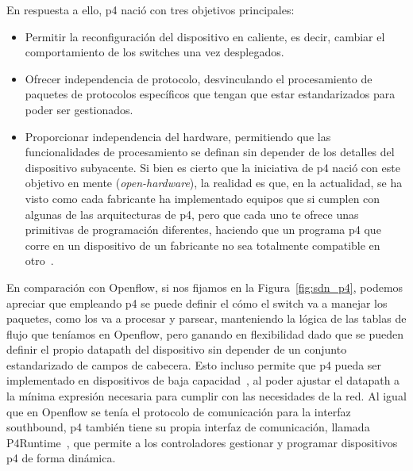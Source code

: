 En respuesta a ello, \gls{p4} nació con tres objetivos principales: 

\begin{itemize}
    \item Permitir la reconfiguración del dispositivo en caliente, es decir, cambiar el comportamiento de los switches una vez desplegados.
    
    \item Ofrecer independencia de protocolo, desvinculando el procesamiento de paquetes de protocolos específicos que tengan que estar estandarizados para poder ser gestionados.
    
    \item Proporcionar independencia del hardware, permitiendo que las funcionalidades de procesamiento se definan sin depender de los detalles del dispositivo subyacente. Si bien es cierto que la iniciativa de \gls{p4} nació con este objetivo en mente (\textit{open-hardware}), la realidad es que, en la actualidad, se ha visto como cada fabricante ha implementado equipos que si cumplen con algunas de las arquitecturas de \gls{p4}, pero que cada uno te ofrece unas primitivas de programación diferentes, haciendo que un programa \gls{p4} que corre en un dispositivo de un fabricante no sea totalmente compatible en otro~\cite{hauser2023survey}. 
\end{itemize}

En comparación con Openflow, si nos fijamos en la Figura~\ref{fig:sdn_p4}, podemos apreciar que empleando \gls{p4} se puede definir el cómo el switch va a manejar los paquetes, como los va a procesar y parsear, manteniendo la lógica de las tablas de flujo que teníamos en Openflow, pero ganando en flexibilidad dado que se pueden definir el propio datapath del dispositivo sin depender de un conjunto estandarizado de campos de cabecera. Esto incluso permite que \gls{p4} pueda ser implementado en dispositivos de baja capacidad~\cite{carrascal2020analysis}, al poder ajustar el datapath a la mínima expresión necesaria para cumplir con las necesidades de la red. Al igual que en Openflow se tenía el protocolo de comunicación para la interfaz southbound, \gls{p4} también tiene su propia interfaz de comunicación, llamada P4Runtime~\cite{p4runtime2023}, que permite a los controladores gestionar y programar dispositivos \gls{p4} de forma dinámica. 

